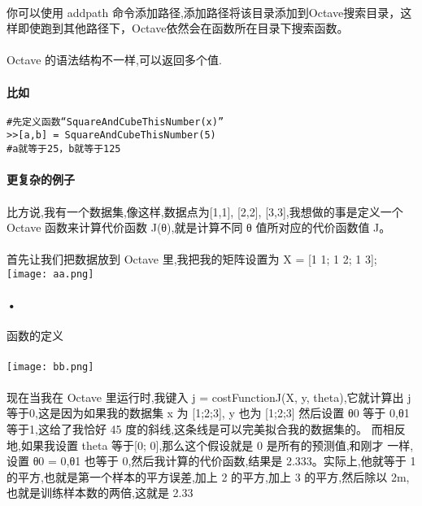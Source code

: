 \documentclass{article}
\begin{document}
\begin{CJK}{UTF8}{gbsn}
\paragraph{}
你可以使用 addpath 命令添加路径,添加路径将该目录添加到Octave搜索目录，这样即使跑到其他路径下，Octave依然会在函数所在目录下搜索函数。
\paragraph{}
Octave 的语法结构不一样,可以返回多个值.
\paragraph{比如}
\begin{verbatim}
#先定义函数“SquareAndCubeThisNumber(x)”
>>[a,b] = SquareAndCubeThisNumber(5)
#a就等于25，b就等于125
\end{verbatim}
\paragraph{更复杂的例子}
\paragraph{}
比方说,我有一个数据集,像这样,数据点为[1,1], [2,2], [3,3],我想做的事是定义一个
Octave 函数来计算代价函数 J(θ),就是计算不同 θ 值所对应的代价函数值 J。
\paragraph{}
首先让我们把数据放到 Octave 里,我把我的矩阵设置为 X = [1 1; 1 2; 1 3];
\texttt{[image: aa.png]}
\paragraph{•}
函数的定义
\paragraph{}
\texttt{[image: bb.png]}
\paragraph{}
现在当我在 Octave 里运行时,我键入 j = costFunctionJ(X, y, theta),它就计算出 j 等于0,这是因为如果我的数据集 x 为 [1;2;3], y 也为 [1;2;3] 然后设置 θ0 等于 0,θ1 等于1,这给了我恰好 45 度的斜线,这条线是可以完美拟合我的数据集的。
而相反地,如果我设置 theta 等于[0; 0],那么这个假设就是 0 是所有的预测值,和刚才
一样,设置 θ0 = 0,θ1 也等于 0,然后我计算的代价函数,结果是 2.333。实际上,他就等于 1 的平方,也就是第一个样本的平方误差,加上 2 的平方,加上 3 的平方,然后除以 2m,也就是训练样本数的两倍,这就是 2.33

\end{CJK}
\end{document}
